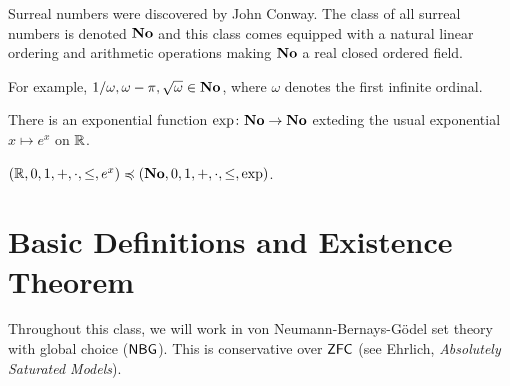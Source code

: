 
Surreal numbers were discovered by John Conway. 
The class of all surreal numbers is denoted $\mathbf{No}$ and 
this class comes equipped with a natural linear ordering and 
arithmetic operations making $\mathbf{No}$ a real closed ordered field. 

For example, $1/ \omega, \omega - \pi, \sqrt{\omega} \in \mathbf{No}$, 
where $\omega$ denotes the first infinite ordinal. 

\begin{theorem}[Kruskal, 1980s]
	There is an exponential function $\exp \colon \mathbf{No} \rightarrow \mathbf{No}$
	exteding the usual exponential $x \mapsto e^x$ on $\mathbb{R}$. 
	\label{}
\end{theorem}

\begin{theorem}
	$(\mathbb{R}, 0, 1, +, \cdot, \leq, e^x) \preccurlyeq 
	(\mathbf{No}, 0, 1, +, \cdot, \leq, \exp)$. 	
	\label{}
\end{theorem}

\section{Basic Definitions and Existence Theorem}
Throughout this class, we will work in von Neumann-Bernays-G\"odel 
set theory with global choice ($\mathsf{NBG}$). This is conservative over 
$\mathsf{ZFC}$ (see Ehrlich, \emph{Absolutely Saturated Models}). 

